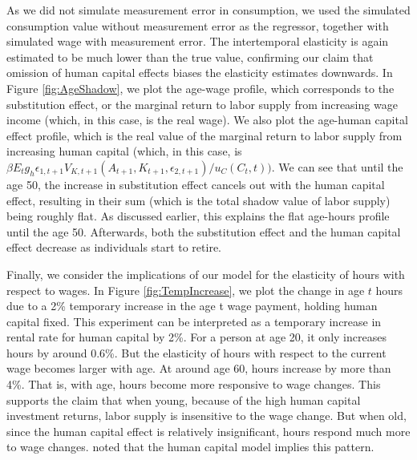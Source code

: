 \documentclass[\econtexRoot/ImaiKeane]{subfiles}
\begin{document}
        As we did not simulate measurement error in consumption, we used the simulated consumption value without measurement error as the regressor, together with simulated wage with measurement error. The intertemporal elasticity is again estimated to be much lower than the true value, confirming our claim that omission of human capital effects biases the elasticity estimates downwards. In Figure \ref{fig:AgeShadow}, we plot the age-wage profile, which corresponds to the substitution effect, or the marginal return to labor supply from increasing wage income (which, in this case, is the real wage). We also plot the age-human capital effect profile, which is the real value of the marginal return to labor supply from increasing human capital (which, in this case, is $\beta E_t g_h \epsilon_{1,t+1} V_{K, t+1}(A_{t+1}, K_{t+1}, \epsilon_{2,t+1})/u_C(C_t, t))$. We can see that until the age 50, the increase in substitution effect cancels out with the human capital effect, resulting in their sum (which is the total shadow value of labor supply) being roughly flat. As discussed earlier, this explains the flat age-hours profile until the age 50. Afterwards, both the substitution effect and the human capital effect decrease as individuals start to retire.\par
        
        
         Finally, we consider the implications of our model for the elasticity of hours with respect to wages. In Figure \ref{fig:TempIncrease}, we plot the change in age $t$ hours due to a 2\% temporary increase in the age t wage payment, holding human capital fixed. This experiment can be interpreted as a temporary increase in rental rate for human capital by 2\%. For a person at age 20, it only increases hours by around 0.6\%. But the elasticity of hours with respect to the current wage becomes larger with age. At around age 60, hours increase by more than 4\%. That is, with age, hours become more responsive to wage changes. This supports the claim that when young, because of the high human capital investment returns, labor supply is insensitive to the wage change. But when old, since the human capital effect is relatively insignificant, hours respond much more to wage changes. \cite{Shaw1989-jb} noted that the human capital model implies this pattern.
\end{document}
